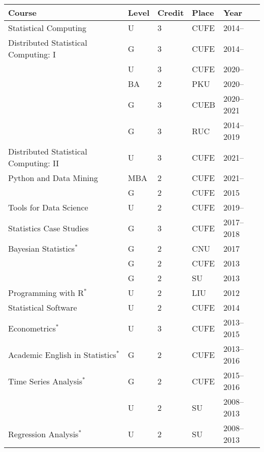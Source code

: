 \documentclass[twoside,a4paper]{article}
\begin{document}
  \begin{tabular}{p{7.5cm}llll}
    \toprule
    Course                                  & Level & Credit  &Place         & Year       \\
    \midrule
    {Statistical Computing}                 & U     & 3  &CUFE          & 2014--     \\
    {Distributed Statistical Computing: I}  & G     & 3  &CUFE          & 2014--     \\
                                            & U     & 3  &CUFE          & 2020--     \\
                                            & BA     & 2  &PKU           & 2020--     \\
                                            & G     & 3  &CUEB          & 2020--2021 \\
                                            & G     & 3  &RUC           & 2014--2019 \\
    {Distributed Statistical Computing: II} & U     & 3  &CUFE          & 2021--     \\
    {Python and Data Mining}   & MBA   & 2  &CUFE          & 2021--     \\
                                            & G     & 2  &CUFE          & 2015       \\
    {Tools for Data Science}                & U     & 2  &CUFE          & 2019--     \\
    {Statistics Case Studies}               & G     & 3  &CUFE          & 2017--2018 \\
    {Bayesian Statistics}$^*$               & G     & 2  &CNU           & 2017       \\
                                            & G     & 2  &CUFE          & 2013       \\
                                            & G     & 2  &SU            & 2013       \\
    {Programming with R}$^*$                & U     & 2  &LIU           & 2012       \\
    {Statistical Software}                  & U     & 2  &CUFE          & 2014       \\
    {Econometrics}$^*$                      & U     & 3  &CUFE          & 2013--2015 \\
    {Academic English in Statistics}$^*$    & G     & 2  &CUFE          & 2013--2016 \\
    {Time Series Analysis}$^*$             & G     & 2  &CUFE          & 2015--2016 \\
                                            & U     & 2  &SU            & 2008--2013 \\
    {Regression Analysis}$^*$               & U     & 2  &SU            & 2008--2013 \\
    \bottomrule
  \end{tabular}
\end{document}

